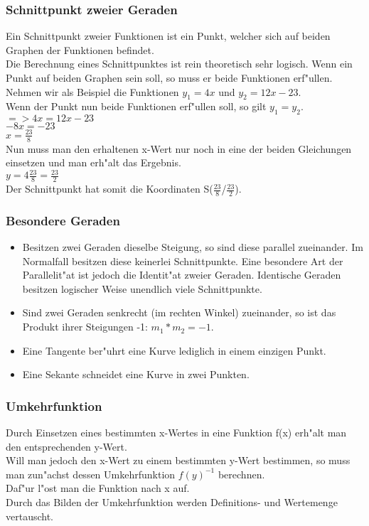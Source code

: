 \subsubsection{Schnittpunkt zweier Geraden}
Ein Schnittpunkt zweier Funktionen ist ein Punkt, welcher sich auf beiden Graphen der Funktionen befindet.\\
Die Berechnung eines Schnittpunktes ist rein theoretisch sehr logisch. Wenn ein Punkt auf beiden Graphen sein soll, so muss er beide Funktionen erf"ullen.\\
Nehmen wir als Beispiel die Funktionen $y_1 = 4x$ und $y_2 = 12x - 23$.\\
Wenn der Punkt nun beide Funktionen erf"ullen soll, so gilt $y_1 = y_2$.\\
$=> 4x = 12x - 23$\\
$-8x = -23$\\
$x = \frac{23}{8}$\\
Nun muss man den erhaltenen x-Wert nur noch in eine der beiden Gleichungen einsetzen und man erh"alt das Ergebnis.\\
$y = 4 \frac{23}{8} = \frac{23}{2}$\\
Der Schnittpunkt hat somit die Koordinaten S($\frac{23}{8}$/$\frac{23}{2}$).

\subsubsection{Besondere Geraden}
\begin{itemize}
\item Besitzen zwei Geraden dieselbe Steigung, so sind diese parallel zueinander. Im Normalfall besitzen diese keinerlei Schnittpunkte. Eine besondere Art der Parallelit"at ist jedoch die Identit"at zweier Geraden. Identische Geraden besitzen logischer Weise unendlich viele Schnittpunkte.
\item Sind zwei Geraden senkrecht (im rechten Winkel) zueinander, so ist das Produkt ihrer Steigungen -1: $m_1 * m_2 = -1$.
\item Eine Tangente ber"uhrt eine Kurve lediglich in einem einzigen Punkt.
\item Eine Sekante schneidet eine Kurve in zwei Punkten.
\end{itemize}

\subsubsection{Umkehrfunktion}
Durch Einsetzen eines bestimmten x-Wertes in eine Funktion f(x) erh"alt man den entsprechenden y-Wert.\\
Will man jedoch den x-Wert zu einem bestimmten y-Wert bestimmen, so muss man zun"achst dessen Umkehrfunktion $f(y)^{-1}$ berechnen.\\
Daf"ur l"ost man die Funktion nach x auf.\\
Durch das Bilden der Umkehrfunktion werden Definitions- und Wertemenge vertauscht.
